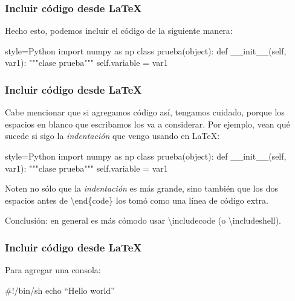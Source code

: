 \documentclass[rodrigo]{wtpc-beamer}
\begin{document}
\begin{frame}[fragile]\frametitle{Incluir código desde \LaTeX}
  Hecho esto, podemos incluir el código de la siguiente manera:
\begin{code}{style=Python}
import numpy as np
class prueba(object):
  def __init__(self, var1):
  """clase prueba"""
  self.variable = var1
\end{code}
\end{frame}

\begin{frame}[fragile]\frametitle{Incluir código desde \LaTeX}
  Cabe mencionar que si agregamos código así, tengamos cuidado, porque
  los espacios en blanco que escribamos los va a considerar. Por
  ejemplo, vean qué sucede si sigo la \textit{indentación} que vengo
  usando en \LaTeX:
  \begin{code}{style=Python}
    import numpy as np
    class prueba(object):
      def __init__(self, var1):
      """clase prueba"""
      self.variable = var1
  \end{code}
  Noten no sólo que la \textit{indentación} es más grande, sino también que los dos espacios antes de \textbackslash end\{code\} los tomó como una línea de código extra.

  Conclusión: en general es más cómodo usar \textbackslash includecode (o \textbackslash includeshell).
\end{frame}

\begin{frame}[fragile]\frametitle{Incluir código desde \LaTeX}
  Para agregar una consola:
\begin{shell}
#!/bin/sh
echo ``Hello world''
\end{shell}
\end{frame}

\end{document}
